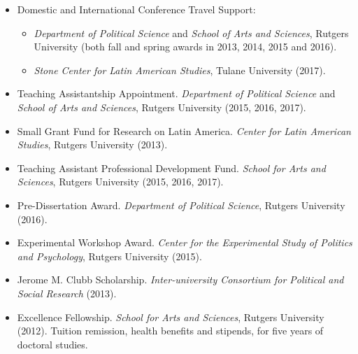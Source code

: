 \begin{itemize}
	
	\item Domestic and International Conference Travel Support: 
		\begin{itemize}
			
			\item \emph{Department of Political Science} and \emph{School of Arts and Sciences}, Rutgers University (both fall and spring awards in 2013, 2014, 2015 and 2016).
			
			\item \emph{Stone Center for Latin American Studies}, Tulane University (2017).
		\end{itemize}
	
	\item Teaching Assistantship Appointment. \emph{Department of Political Science} and \emph{School of Arts and Sciences}, Rutgers University (2015, 2016, 2017).
	
	\item Small Grant Fund for Research on Latin America. \emph{Center for Latin American Studies}, Rutgers University (2013).
	
	\item Teaching Assistant Professional Development Fund. \emph{School for Arts and Sciences}, Rutgers University (2015, 2016, 2017).
	
	\item Pre-Dissertation Award. \emph{Department of Political Science}, Rutgers University (2016).
	
	\item Experimental Workshop Award. \emph{Center for the Experimental Study of Politics and Psychology}, Rutgers University (2015).
	
	\item Jerome M. Clubb Scholarship. \emph{Inter-university Consortium for Political and Social Research} (2013).
	
	\item Excellence Fellowship. \emph{School for Arts and Sciences}, Rutgers University (2012). Tuition remission, health benefits and stipends, for five years of doctoral studies.
\end{itemize}